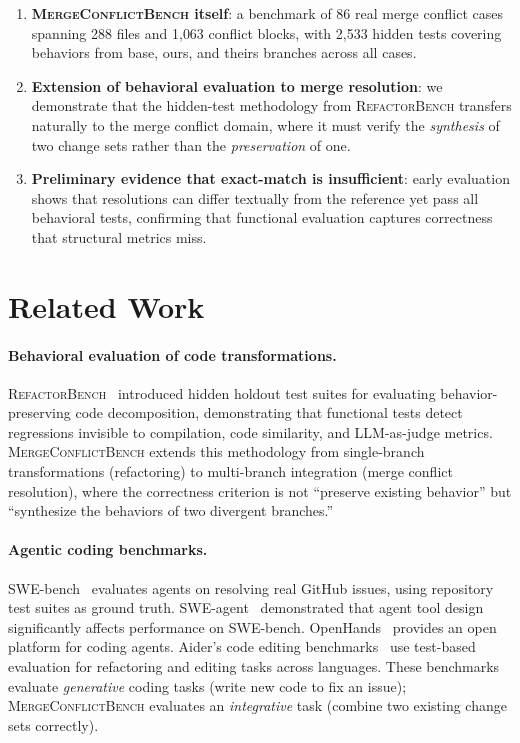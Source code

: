 \documentclass[11pt,a4paper]{article}
\begin{document}
\begin{enumerate}[leftmargin=2em]
\item \textbf{\textsc{MergeConflictBench} itself}: a benchmark of 86 real merge conflict cases spanning 288 files and 1{,}063 conflict blocks, with 2{,}533 hidden tests covering behaviors from base, ours, and theirs branches across all cases.

\item \textbf{Extension of behavioral evaluation to merge resolution}: we demonstrate that the hidden-test methodology from \textsc{RefactorBench} transfers naturally to the merge conflict domain, where it must verify the \emph{synthesis} of two change sets rather than the \emph{preservation} of one.

\item \textbf{Preliminary evidence that exact-match is insufficient}: early evaluation shows that resolutions can differ textually from the reference yet pass all behavioral tests, confirming that functional evaluation captures correctness that structural metrics miss.
\end{enumerate}

\section{Related Work}
\label{sec:related}

\paragraph{Behavioral evaluation of code transformations.} \textsc{RefactorBench}~\citep{chen2025refactorbench} introduced hidden holdout test suites for evaluating behavior-preserving code decomposition, demonstrating that functional tests detect regressions invisible to compilation, code similarity, and LLM-as-judge metrics. \textsc{MergeConflictBench} extends this methodology from single-branch transformations (refactoring) to multi-branch integration (merge conflict resolution), where the correctness criterion is not ``preserve existing behavior'' but ``synthesize the behaviors of two divergent branches.''

\paragraph{Agentic coding benchmarks.} SWE-bench~\citep{jimenez2024swebench} evaluates agents on resolving real GitHub issues, using repository test suites as ground truth. SWE-agent~\citep{yang2024sweagent} demonstrated that agent tool design significantly affects performance on SWE-bench. OpenHands~\citep{wang2024openhands} provides an open platform for coding agents. Aider's code editing benchmarks~\citep{gauthier2024aider,gauthier2024polyglot} use test-based evaluation for refactoring and editing tasks across languages. These benchmarks evaluate \emph{generative} coding tasks (write new code to fix an issue); \textsc{MergeConflictBench} evaluates an \emph{integrative} task (combine two existing change sets correctly).
\end{document}
